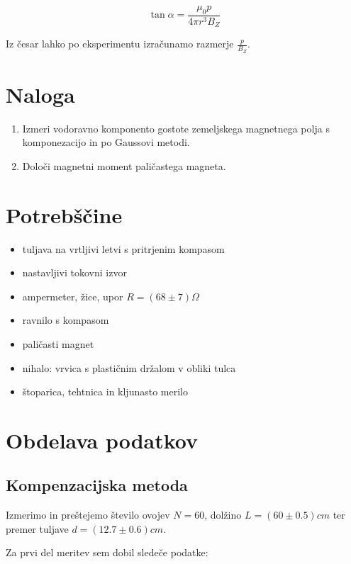 \documentclass[12pt]{report}
\begin{document}
\begin{equation}
  \tan \alpha = \frac{\mu_0 p}{4\pi r^3 B_Z}
\end{equation}

Iz česar lahko po eksperimentu izračunamo razmerje $\frac{p}{B_Z}$.


\chapter*{Naloga}

\begin{enumerate}
  \item Izmeri vodoravno komponento gostote zemeljskega magnetnega polja s komponezacijo in po Gaussovi metodi. 
  \item Določi magnetni moment paličastega magneta. 
\end{enumerate}

\begingroup
\let\clearpage\relax

\chapter*{Potrebščine}
\begin{itemize}
  \item tuljava na vrtljivi letvi s pritrjenim kompasom
  \item nastavljivi tokovni izvor
  \item ampermeter, žice, upor $R = (68 \pm 7)\Omega$
  \item ravnilo s kompasom
  \item paličasti magnet
  \item nihalo: vrvica s plastičnim držalom v obliki tulca
  \item štoparica, tehtnica in kljunasto merilo
\end{itemize}

\endgroup


\chapter*{Obdelava podatkov}

\section*{Kompenzacijska metoda}

Izmerimo in preštejemo število ovojev $N = 60$, dolžino $L = (60 \pm 0.5)cm$ ter premer tuljave $d = (12.7 \pm 0.6)cm$. 

Za prvi del meritev sem dobil sledeče podatke: 
\end{document}
